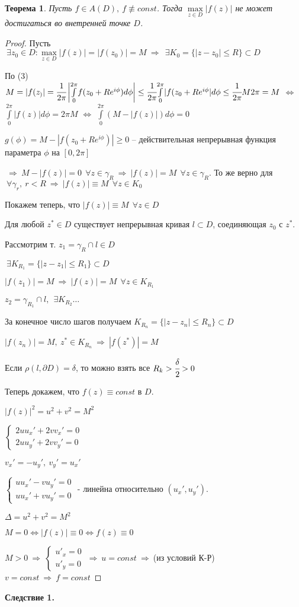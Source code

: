 \documentclass[draft]{report}
\newcommand{\dd}{\partial}
\newcommand{\then}{\ \Rightarrow\ }
\newcommand{\mint}[2]{\underset{#1}{\overset{#2}{\int}}}
\newcommand{\LRA}{\Leftrightarrow}
\newcommand{\g}{\gamma}
\renewcommand{\f}{\phi}
\renewcommand{\d}{\delta}
\newcommand{\D}{\Delta}
\newcommand{\E}{\ \exists}
\newcommand{\F}{\ \forall}
\newcommand{\sys}[1]{\left\{\begin{matrix}#1\end{matrix}\right.}
\newtheorem*{theor}{Теорема}
\theoremstyle{remark}
\begin{document}
\begin{theor}
Пусть $f\in A(D),\ f\not\equiv const$. Тогда $\underset{z\in D}{\max}|f(z)|$ не может достигаться во внетренней точке $D$.
\end{theor}
\begin{proof}
Пусть $\E z_0\in D\colon\underset{z\in D}{\max}|f(z)|=|f(z_0)|=M \then \E K_0=\{|z-z_0|\leq R\}\subset D$

По (3) $M=|f(z_)|=\cfrac{1}{2\pi}\left|\mint{0}{2\pi}f(z_0+Re^{i\f})d\f\right|\leq\cfrac{1}{2\pi}\mint{0}{2\pi}|f(z_0+Re^{i\f}|d\f\leq\cfrac{1}{2\pi}M2\pi=M$
$\LRA$
$\mint{0}{2\pi}|f(z)|d\f=2\pi M$
$\LRA$
$\mint{0}{2\pi}(M-|f(z)|)d\f=0$

$g(\f)=M-|f(z_0+Re^{i\f})|\geq 0$ -- действительная непрерывная функция параметра $\f$ на $[0,2\pi]$

$\then M-|f(z)|=0\ \F z\in\g_R \then |f(z)|=M\ \F z\in\g_R$. То же верно для $\F \g_r,\ r<R \then |f(z)|\equiv M\ \F z\in K_0$

Покажем теперь, что $|f(z)|\equiv M\ \F z\in D$

Для любой $z^*\in D$ существует непрерывная кривая $l\subset D$, соединяющая $z_0$ с $z^*$.

Рассмотрим т. $z_1=\g_R\cap l\in D$

$\E K_{R_1}=\{|z-z_1|\leq R_1\}\subset D$

$|f(z_1)|=M\then |f(z)|=M\ \F z\in K_{R_1}$

$z_2=\g_{R_1}\cap l,\ \E K_{R_2}\ldots$

За конечное число шагов получаем $K_{R_n}=\{|z-z_n|\leq R_n\}\subset D$

$|f(z_n)|=M,\ z^*\in K_{R_n} \then |f(z^*)|=M$

Если $\rho(l,\dd D)=\d$, то можно взять все $R_k>\cfrac\d2>0$

Теперь докажем, что $f(z)\equiv const$ в $D$.

$|f(z)|^2=u^2+v^2=M^2$

$\sys{2uu_x'+2vv_x'=0 \\ 2uu_y'+2vv_y'=0}$

$v_x'=-u_y',\ v_y'=u_x'$

$\sys{uu_x'-vu_y'=0 \\ uu_x'+vu_y'=0}$ - линейна относительно $(u_x', u_y')$.

$\D =u^2+v^2=M^2$

$M=0\LRA |f(z)|\equiv 0\LRA f(z)\equiv 0$

$M>0\then\sys{u'_x=0 \\ u'_y=0}\then u=const\then$(из условий К-Р) $v=const\then f=const$
\end{proof}
{\bfseries Следствие 1.}
\end{document}
